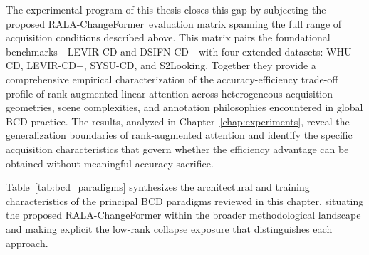 The experimental program of this thesis closes this gap by subjecting the proposed RALA-ChangeFormer\allowbreak\ evaluation matrix spanning the full range of acquisition conditions described above. This matrix pairs the
foundational benchmarks---LEVIR-CD and DSIFN-CD---with four extended
datasets: WHU-CD, LEVIR-CD+, SYSU-CD, and S2Looking. Together they provide
a comprehensive empirical characterization of the accuracy-efficiency
trade-off profile of rank-augmented linear attention across heterogeneous
acquisition geometries, scene complexities, and annotation philosophies
encountered in global BCD practice. The results, analyzed in
Chapter~\ref{chap:experiments}, reveal the generalization boundaries of
rank-augmented attention and identify the specific acquisition
characteristics that govern whether the efficiency advantage can be
obtained without meaningful accuracy sacrifice.

Table~\ref{tab:bcd_paradigms} synthesizes the architectural and training
characteristics of the principal BCD paradigms reviewed in this chapter,
situating the proposed RALA-ChangeFormer within the broader methodological
landscape and making explicit the low-rank collapse exposure that
distinguishes each approach.

